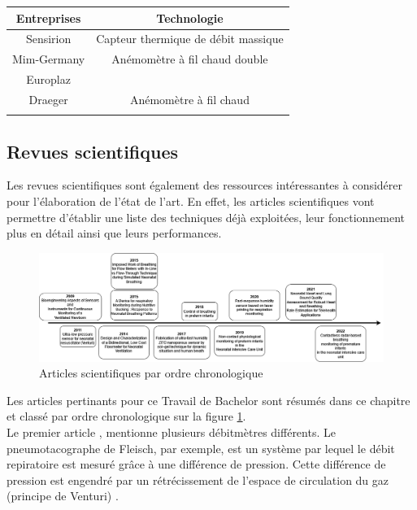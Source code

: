 \begin{centering}
    \begin{tabular}{|c|c|}
        \hline
        Entreprises & Technologie                         \\
        \hline
        Sensirion   & Capteur thermique de débit massique \\
        \hline
        Mim-Germany & Anémomètre à fil chaud double       \\
        \hline
        Europlaz    &                                     \\
        \hline
        Draeger     & Anémomètre à fil chaud              \\
        \hline
        \label{tab:marques}
    \end{tabular}
\end{centering}


\subsection{Revues scientifiques}
Les revues scientifiques sont également des ressources intéressantes à considérer pour l'élaboration de l'état de l'art. En effet, les 
articles scientifiques vont permettre d'établir une liste des techniques déjà exploitées, leur fonctionnement plus en détail ainsi que leurs 
performances. \\
\begin{figure}[H]
    \centering
    \includegraphics[scale = 0.5]{images/DRP_Etat_de_l_art.png}
    \caption{Articles scientifiques par ordre chronologique}
    \label{fig:articlesChrono}
\end{figure}

Les articles pertinants pour ce Travail de Bachelor sont résumés dans ce chapitre et classé par ordre chronologique sur la figure 
\ref{fig:articlesChrono}. \\

Le premier article \cite{rolfe_bioengineering_2009}, mentionne plusieurs débitmètres différents. Le pneumotacographe de Fleisch, par exemple, est un 
système par lequel le débit repiratoire est mesuré grâce à une différence de pression. Cette différence de pression est engendré par 
un rétrécissement de l'espace de circulation du gaz (principe de Venturi) \cite{oberg_biomedical_2011}. \\

